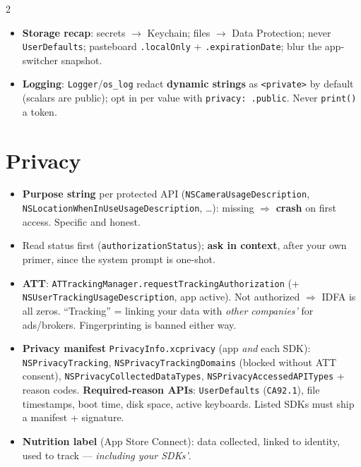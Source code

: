 \documentclass[8pt]{extarticle}
\begin{document}
\begin{multicols}{2}
\begin{itemize}
        (\texttt{DCDevice}): 2 bits per device per developer, survive
        reinstall — ``free trial used?'', not integrity.
  \item \textbf{Storage recap}: secrets $\to$ Keychain; files $\to$ Data
        Protection; never \texttt{UserDefaults}; pasteboard
        \texttt{.localOnly} + \texttt{.expirationDate}; blur the app-switcher
        snapshot.
  \item \textbf{Logging}: \texttt{Logger}/\texttt{os\_log} redact
        \textbf{dynamic strings} as \texttt{<private>} by default (scalars are
        public)\unverified; opt in per value with \texttt{privacy: .public}. Never
        \texttt{print()} a token.
\end{itemize}

\section{Privacy}
\begin{itemize}
  \item \textbf{Purpose string} per protected API
        (\texttt{NSCameraUsageDescription},
        \texttt{NSLocationWhenInUseUsageDescription}, …): missing $\Rightarrow$
        \textbf{crash} on first access. Specific and honest.
  \item Read status first (\texttt{authorizationStatus}); \textbf{ask in
        context}, after your own primer, since the system prompt is one-shot.
  \item \textbf{ATT}: \texttt{ATTrackingManager.requestTrackingAuthorization}
        (+ \texttt{NSUserTrackingUsageDescription}, app active). Not
        authorized $\Rightarrow$ IDFA is all zeros. ``Tracking'' = linking
        your data with \emph{other companies'} for ads/brokers.
        Fingerprinting is banned either way.
  \item \textbf{Privacy manifest} \texttt{PrivacyInfo.xcprivacy} (app
        \emph{and} each SDK): \texttt{NSPrivacyTracking},
        \texttt{NSPrivacyTrackingDomains} (blocked without ATT consent),
        \texttt{NSPrivacyCollectedDataTypes},
        \texttt{NSPrivacyAccessedAPITypes} + reason codes.
        \textbf{Required-reason APIs}: \texttt{UserDefaults}
        (\texttt{CA92.1}\unverified), file timestamps, boot time, disk space, active
        keyboards. Listed SDKs must ship a manifest + signature.
  \item \textbf{Nutrition label} (App Store Connect): data collected,
        linked to identity, used to track — \emph{including your SDKs'}.
\end{itemize}


\end{multicols}
\end{document}
